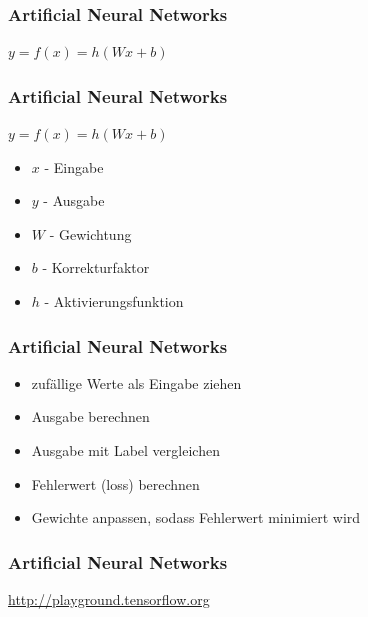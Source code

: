 \documentclass[12pt,utf8]{beamer}
\begin{document}
	\begin{frame}
		\frametitle{Artificial Neural Networks}
		\begin{figure}[h]
			\centering
		\end{figure}
		\centering $y = f(x) = h(Wx + b)$
	\end{frame}
	
	\begin{frame}
		\frametitle{Artificial Neural Networks}
		\begin{center}
			$y = f(x) = h(Wx + b)$
		\end{center}
		\begin{itemize}
			\item $x$ - Eingabe
			\item $y$ - Ausgabe
			\item $W$ - Gewichtung
			\item $b$ - Korrekturfaktor
			\item $h$ - Aktivierungsfunktion
		\end{itemize}
	\end{frame}
	
	\begin{frame}
		\frametitle{Artificial Neural Networks}
		\begin{itemize}
			\item zufällige Werte als Eingabe ziehen
			\item Ausgabe berechnen
			\item Ausgabe mit Label vergleichen
			\item Fehlerwert (loss) berechnen
			\item Gewichte anpassen, sodass Fehlerwert minimiert wird
		\end{itemize}
	\end{frame}
	
	\begin{frame}
		\frametitle{Artificial Neural Networks}
		\centering \url{http://playground.tensorflow.org}
	\end{frame}
	
	\begin{frame}
		
		
		\addcontentsline{toc}{section}{\bibname}
	\end{frame}
\end{document}
